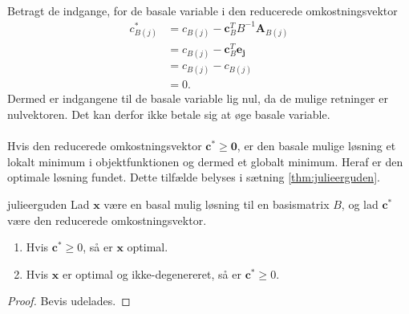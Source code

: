 {\begin{align*}
\end{align*}
%
Betragt de indgange, for de basale variable i den reducerede omkostningsvektor
%
\begin{align*}
c^*_{B(j)} & = c_{B(j)} - \mathbf{c}_B^T B^{-1} \mathbf{A}_{B(j)} \\
& = c_{B(j)} - \mathbf{c}_B^T \mathbf{e_j} \\
& = c_{B(j)} -  c_{B(j)}  \\
& = 0.
\end{align*}
%
Dermed er indgangene til de basale variable lig nul, da de mulige retninger er nulvektoren. 
Det kan derfor ikke betale sig at øge basale variable.
\\\\
Hvis den reducerede omkostningsvektor $\mathbf{c}^* \geq \mathbf{0}$, er den basale mulige løsning et lokalt minimum i objektfunktionen og dermed et globalt minimum. Heraf er den optimale løsning fundet. Dette tilfælde belyses i sætning \ref{thm:julieerguden}.
%
\begin{thm}{}{julieerguden}
Lad $\mathbf{x}$ være en basal mulig løsning til en basismatrix $B$, og lad $\mathbf{c}^*$ være den reducerede omkostningsvektor. 
\begin{enumerate}[label = (\alph*)]
\item Hvis $\mathbf{c}^* \geq 0$, så er $\mathbf{x}$ optimal.
\item Hvis $\mathbf{x}$ er optimal og ikke-degenereret, så er $\mathbf{c}^* \geq 0$.
\end{enumerate}
\end{thm}
%
\begin{proof}
Bevis udelades.

\end{proof}}

